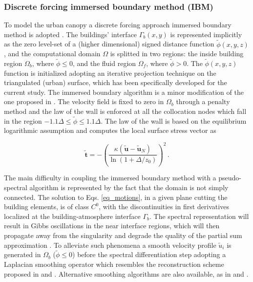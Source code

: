 \subsubsection{Discrete forcing immersed boundary method (IBM)}

To model the urban canopy a discrete forcing approach immersed boundary method is adopted \citep{Mohd-yusof1997,Mittal2005}. 
The buildings' interface $\Gamma_{b}(x,y)$ is represented implicitly as the zero level-set of a (higher dimensional) signed distance function $\tilde{\phi}(x,y,z)$, and the computational domain $\Omega$ is splitted in two regions: the inside building region $\Omega_b$, where $\tilde{\phi} \leq 0$, and the fluid region $\Omega_f$, where $\tilde{\phi} > 0$.
The $\tilde{\phi}(x,y,z)$ function is initialized adopting an iterative projection technique on the  triangulated (urban) surface, which has been specifically developed for the current study.
The immersed boundary algorithm is a minor modification of the one proposed in \cite{Chester2007}. 
The velocity field is fixed to zero in $\Omega_b$ through a penalty method and the law of the wall is enforced at all the collocation nodes which fall in the region $-1.1 \Delta \le \tilde{\phi} \le 1.1 \Delta$. 
The law of the wall is based on the equilibrium logarithmic assumption \citep{Moeng1984} and computes the local surface stress vector as 
%
\begin{linenomath*}
\begin{equation}
      \mathbf{\tilde{t}} = - \left( \frac{ \kappa ( \mathbf{\tilde{u}} - \mathbf{\tilde{u}}_N )}{\ln{(1+\Delta/z_0)}} \right)^2 \, .
\end{equation}
\end{linenomath*}
%
The main difficulty in coupling the immersed boundary method with a pseudo-spectral algorithm is represented by the fact that the domain is not simply connected. 
The solution to Eqs. \ref{eq_motions}, in a given plane cutting the building elements, is of class $C^0$, with the discontinuities in first derivatives localized at the building-atmosphere interface $\Gamma_{b}$. The spectral representation will result in Gibbs oscillations in the near interface regions, which will then propagate away from the singularity and degrade the quality of the partial sum approximation \citep{Geer1997}.
To alleviate such phenomena a smooth velocity profile $\tilde{u}_i$ is generated in $\Omega_b$ ($\tilde{\phi} \le 0$) before the spectral differentiation step \citep{Tseng2006} adopting a Laplacian smoothing operator which resembles the reconstruction scheme proposed in \citet{Cai1989} and \citet{Geer1997}. 
Alternative smoothing algorithms are also available, as in \citet{Fang2011} and \citet{Li2016}.

